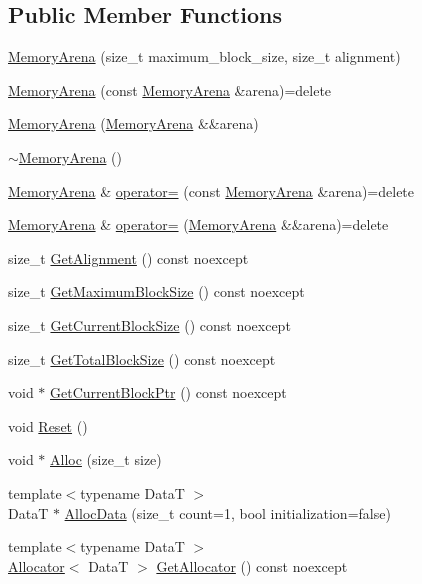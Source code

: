 \subsection*{Public Member Functions}
\begin{DoxyCompactItemize}
\item 
\hyperlink{classmage_1_1_memory_arena_a139f7781be209bb29e7ad0ed04cb32a5}{Memory\+Arena} (size\+\_\+t maximum\+\_\+block\+\_\+size, size\+\_\+t alignment)
\item 
\hyperlink{classmage_1_1_memory_arena_a1eca6fdacbd1226f4b21f443d118168b}{Memory\+Arena} (const \hyperlink{classmage_1_1_memory_arena}{Memory\+Arena} \&arena)=delete
\item 
\hyperlink{classmage_1_1_memory_arena_a98829c5a87ba028c376f100cca09e876}{Memory\+Arena} (\hyperlink{classmage_1_1_memory_arena}{Memory\+Arena} \&\&arena)
\item 
\hyperlink{classmage_1_1_memory_arena_acfee6fc205e2eaf6aeef4acf19948e6e}{$\sim$\+Memory\+Arena} ()
\item 
\hyperlink{classmage_1_1_memory_arena}{Memory\+Arena} \& \hyperlink{classmage_1_1_memory_arena_a7e7799f859c55435714933972ecb8b95}{operator=} (const \hyperlink{classmage_1_1_memory_arena}{Memory\+Arena} \&arena)=delete
\item 
\hyperlink{classmage_1_1_memory_arena}{Memory\+Arena} \& \hyperlink{classmage_1_1_memory_arena_aa4b80a917a838a1ca3788f906723d273}{operator=} (\hyperlink{classmage_1_1_memory_arena}{Memory\+Arena} \&\&arena)=delete
\item 
size\+\_\+t \hyperlink{classmage_1_1_memory_arena_a79931a18af492ad8ef7e99b09ec36f2a}{Get\+Alignment} () const noexcept
\item 
size\+\_\+t \hyperlink{classmage_1_1_memory_arena_a6786cf52a03777580b439cafdd8ff8f9}{Get\+Maximum\+Block\+Size} () const noexcept
\item 
size\+\_\+t \hyperlink{classmage_1_1_memory_arena_a0b41d6901c3519f046cd551931f72c1b}{Get\+Current\+Block\+Size} () const noexcept
\item 
size\+\_\+t \hyperlink{classmage_1_1_memory_arena_ac8e8ac4ba60cd2bb1d8dc8a5d4a9f4ad}{Get\+Total\+Block\+Size} () const noexcept
\item 
void $\ast$ \hyperlink{classmage_1_1_memory_arena_a7bdbc9da32c1f8d49ce5d2f153870284}{Get\+Current\+Block\+Ptr} () const noexcept
\item 
void \hyperlink{classmage_1_1_memory_arena_a117b74c7bd5dfb28dfdaae6cab253491}{Reset} ()
\item 
void $\ast$ \hyperlink{classmage_1_1_memory_arena_a2e63b11c535dbfefd69d071466be9ce1}{Alloc} (size\+\_\+t size)
\item 
{\footnotesize template$<$typename DataT $>$ }\\DataT $\ast$ \hyperlink{classmage_1_1_memory_arena_a1e83a02b5f5a74ad29d7a2c7f1f539d0}{Alloc\+Data} (size\+\_\+t count=1, bool initialization=false)
\item 
{\footnotesize template$<$typename DataT $>$ }\\\hyperlink{structmage_1_1_memory_arena_1_1_allocator}{Allocator}$<$ DataT $>$ \hyperlink{classmage_1_1_memory_arena_a722a884e077c903a586a6cb08ce98b24}{Get\+Allocator} () const noexcept
\end{DoxyCompactItemize}
